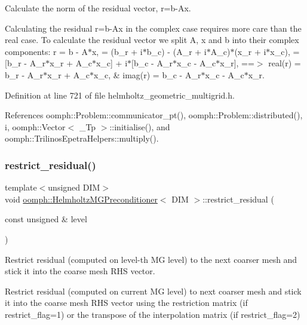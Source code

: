 Calculate the norm of the residual vector, r=b-\/\+Ax. 

Calculating the residual r=b-\/\+Ax in the complex case requires more care than the real case. To calculate the residual vector we split A, x and b into their complex components\+: r = b -\/ A$\ast$x, = (b\+\_\+r + i$\ast$b\+\_\+c) -\/ (A\+\_\+r + i$\ast$\+A\+\_\+c)$\ast$(x\+\_\+r + i$\ast$x\+\_\+c), = \mbox{[}b\+\_\+r -\/ A\+\_\+r$\ast$x\+\_\+r + A\+\_\+c$\ast$x\+\_\+c\mbox{]} + i$\ast$\mbox{[}b\+\_\+c -\/ A\+\_\+r$\ast$x\+\_\+c -\/ A\+\_\+c$\ast$x\+\_\+r\mbox{]}, ==$>$ real(r) = b\+\_\+r -\/ A\+\_\+r$\ast$x\+\_\+r + A\+\_\+c$\ast$x\+\_\+c, \& imag(r) = b\+\_\+c -\/ A\+\_\+r$\ast$x\+\_\+c -\/ A\+\_\+c$\ast$x\+\_\+r. 

Definition at line 721 of file helmholtz\+\_\+geometric\+\_\+multigrid.\+h.



References oomph\+::\+Problem\+::communicator\+\_\+pt(), oomph\+::\+Problem\+::distributed(), i, oomph\+::\+Vector$<$ \+\_\+\+Tp $>$\+::initialise(), and oomph\+::\+Trilinos\+Epetra\+Helpers\+::multiply().

\mbox{\label{classoomph_1_1HelmholtzMGPreconditioner_a013c21557363edf86790fa98a1da2aff}} 
\subsubsection{\texorpdfstring{restrict\+\_\+residual()}{restrict\_residual()}}
{\footnotesize\ttfamily template$<$unsigned D\+IM$>$ \\
void \hyperlink{classoomph_1_1HelmholtzMGPreconditioner}{oomph\+::\+Helmholtz\+M\+G\+Preconditioner}$<$ D\+IM $>$\+::restrict\+\_\+residual (\begin{DoxyParamCaption}\item[{const unsigned \&}]{level }\end{DoxyParamCaption})}



Restrict residual (computed on level-\/th MG level) to the next coarser mesh and stick it into the coarse mesh R\+HS vector. 

Restrict residual (computed on current MG level) to next coarser mesh and stick it into the coarse mesh R\+HS vector using the restriction matrix (if restrict\+\_\+flag=1) or the transpose of the interpolation matrix (if restrict\+\_\+flag=2) 


